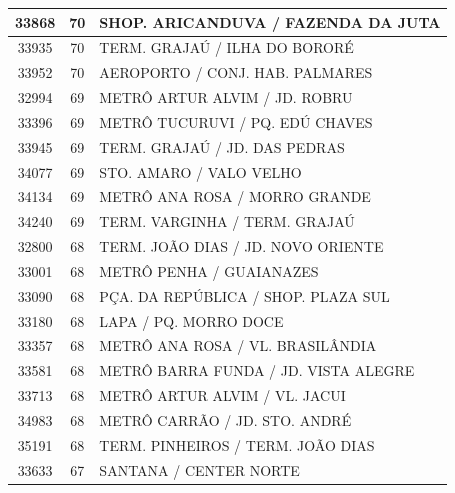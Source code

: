 \documentclass[
	12pt,				%
	oneside,			%
	a4paper,			%
	english,			%
	brazil				%
	]{abntex2ppgsi}
\begin{document}
{{\begin{apendicesenv}
\begin{longtable}{c|c|p{7cm}}
    33868 & 70    & SHOP. ARICANDUVA / FAZENDA DA JUTA \\
\hline

    33935 & 70    & TERM. GRAJAÚ / ILHA DO BORORÉ \\
\hline

    33952 & 70    & AEROPORTO / CONJ. HAB. PALMARES \\
\hline

    32994 & 69    & METRÔ ARTUR ALVIM / JD. ROBRU \\
\hline

    33396 & 69    & METRÔ TUCURUVI / PQ. EDÚ CHAVES \\
\hline

    33945 & 69    & TERM. GRAJAÚ / JD. DAS PEDRAS \\
\hline

    34077 & 69    & STO. AMARO / VALO VELHO \\
\hline

    34134 & 69    & METRÔ ANA ROSA / MORRO GRANDE \\
\hline

    34240 & 69    & TERM. VARGINHA / TERM. GRAJAÚ \\
\hline

    32800 & 68    & TERM. JOÃO DIAS / JD. NOVO ORIENTE \\
\hline

    33001 & 68    & METRÔ PENHA / GUAIANAZES \\
\hline

    33090 & 68    & PÇA. DA REPÚBLICA / SHOP. PLAZA SUL \\
\hline

    33180 & 68    & LAPA / PQ. MORRO DOCE \\
\hline

    33357 & 68    & METRÔ ANA ROSA / VL. BRASILÂNDIA \\
\hline

    33581 & 68    & METRÔ BARRA FUNDA / JD. VISTA ALEGRE \\
\hline

    33713 & 68    & METRÔ ARTUR ALVIM / VL. JACUI \\
\hline

    34983 & 68    & METRÔ CARRÃO / JD. STO. ANDRÉ \\
\hline

    35191 & 68    & TERM. PINHEIROS / TERM. JOÃO DIAS \\
\hline

    33633 & 67    & SANTANA / CENTER NORTE \\
\hline


\end{longtable}
\end{apendicesenv}}}
\end{document}
